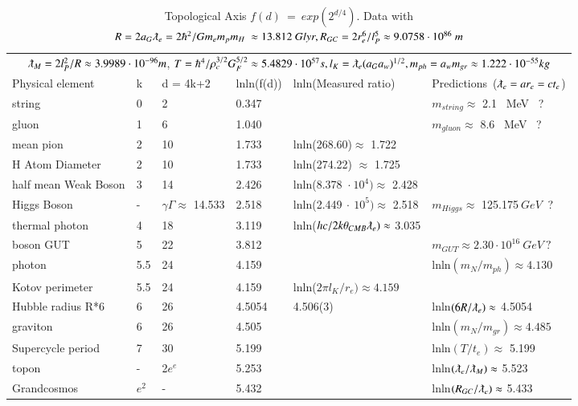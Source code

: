\documentclass[twoside,draft]{article}
\begin{document}
\begin{sloppypar}
\begin{figure}
\label{fig:figure_label}
\end{figure}


\begin{table}
 \caption{Topological Axis $f(d)~=~exp(2^{d/4})$. Data with $R = 2a_G\lambdabar_e=2\hbar^2/Gm_em_pm_H~ \approx 13.812~ Glyr,R_{GC}=2r_e^6/l_P^5\approx 9.0758\cdot 10^{86}~m $}  
  
  \begin{tabular}{llllll}
    \toprule
    \multicolumn{6}{c}{$\lambdabar_M = 2l_P^2/R \approx 3.9989\cdot10^{-96} m$, $T = \hbar^{4} /\rho_{c}^{3/2} G_{F}^{5/2} \approx 5.4829 \cdot 10^{57} s, l_K = \lambdabar_e(a_Ga_w)^{1/2}, m_{ph}=a_wm_{gr}\approx 1.222\cdot10^{-55}kg$}                   \\
    \cmidrule(r){1-6}
   Physical element     & k     & d = 4k+2 & lnln(f(d)) & lnln(Measured ratio)\cite{Tanabashi} & Predictions~($\lambdabar_e = ar_e = ct_e$) \\
    \midrule
    string & 0  & 2 & 0.347 &  & $ m_{string} \approx$ 2.1~ MeV ~? \\
    gluon  & 1 & 6 & 1.040 &  & $m_{gluon} \approx$ 8.6~ MeV ~? \\  
    mean pion & 2  & 10 & 1.733 & lnln(268.60)$\approx$ 1.722 &  \\ 
    H Atom Diameter & 2  & 10 & 1.733 & lnln(274.22) $\approx$ 1.725  &  \\
    half mean Weak Boson & 3  & 14 & 2.426 & lnln(8.378~$\cdot~10^4)\approx$ 2.428  &   \\
    Higgs Boson & - & $\gamma\Gamma \approx$ 14.533 & 2.518 &lnln(2.449$~\cdot~10^5)\approx$ 2.518& $m_{Higgs} \approx$ 125.175$~ GeV ~$ ? \\ 
    thermal photon & 4  & 18 & 3.119 & lnln($hc/2k\theta_{CMB}\lambdabar_e) \approx$ 3.035 &  \\
    boson GUT & 5  & 22 & 3.812 & & $m_{GUT} \approx 2.30\cdot 10^{16}~GeV~?$ \\
    photon & 5.5  & 24 & 4.159 & & lnln$(m_N/m_{ph})\approx 4.130$ \\
    Kotov perimeter & 5.5  & 24 & 4.159 &lnln($2\pi l_K /r_e)\approx 4.159$ &  \\
    Hubble radius R*6 & 6  & 26 & 4.5054 & 4.506(3)\cite{Bonvin} & lnln$(6 R /\lambdabar_e)\approx$ 4.5054  \\
    graviton & 6  & 26 & 4.505 &  & lnln$(m_N/m_{gr})\approx 4.485$ \\
    Supercycle period & 7  & 30 & 5.199 & & lnln$(T/t_e) \approx$ 5.199 \\
    topon & - & 2$e^e$ & 5.253 &  & lnln$(\lambdabar_e/\lambdabar_M) \approx$ 5.523 \\
    Grandcosmos & $e^2$  & - & 5.432 & & lnln$(R_{GC}/\lambdabar_e)\approx$ 5.433  \\
    \bottomrule
  \end{tabular}
  \label{tab:table}
\end{table}



\end{sloppypar}
\end{document}
